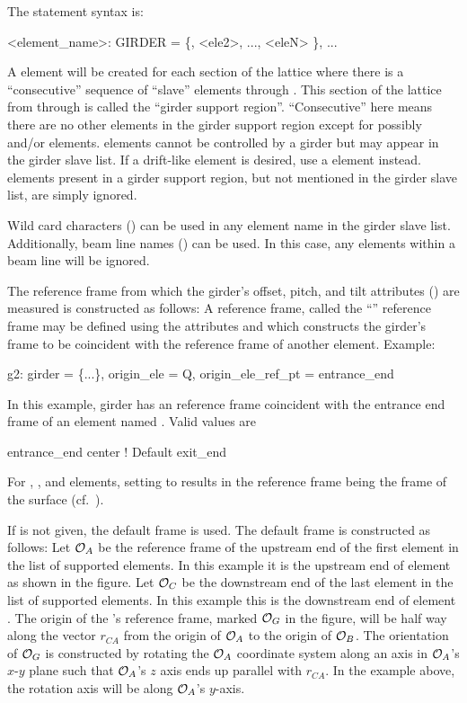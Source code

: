The  statement syntax is:
\begin{example}
  <element_name>: GIRDER = \{<ele1>, <ele2>, ..., <eleN> \}, ...
\end{example}
A  element will be created for each section of the lattice
where there is a ``consecutive'' sequence of ``slave'' elements
 through .  This section of the lattice from
 through  is called the ``girder support
region''.  ``Consecutive'' here means there are no other elements in the
girder support region except for possibly  and/or 
elements.   elements cannot be controlled by a girder but may
appear in the girder slave list. If a drift-like element is
desired, use a  element instead.  elements present
in a girder support region, but not mentioned in the girder slave
list, are simply ignored.

Wild card characters () can be used in any element
name in the girder slave list. Additionally, beam line names
() can be used. In this case, any  elements
within a beam line will be ignored.

The reference frame from which the girder's offset, pitch, and tilt
attributes () are measured is constructed as follows: A
reference frame, called the ``'' reference frame may be
defined using the attributes  and
 which constructs the girder's
 frame to be coincident with the reference frame of another
element. Example:
\begin{example}
  g2: girder = \{...\}, origin_ele = Q, origin_ele_ref_pt = entrance_end
\end{example}
In this example, girder  has an  reference frame
coincident with the entrance end frame of an element named
. Valid values are
\begin{example}
  entrance_end
  center        ! Default
  exit_end
\end{example}
For , , and  elements,
setting  to  results in the reference
frame being the frame of the surface (cf.~).

If  is not given, the default  frame is
used. The default  frame is constructed as follows:
Let ${\cal O}_A$ be the reference frame of the upstream end of
the first element in the list of supported elements. In this example
it is the upstream end of element  as shown in the figure. Let
${\cal O}_C$ be the downstream end of the last element in the list of
supported elements. In this example this is the downstream end of
element . The origin of the 's reference frame,
marked ${\cal O}_G$ in the figure, will be half way along the vector
$r_{CA}$ from the origin of ${\cal O}_A$ to the origin of ${\cal O}_B$.  The
orientation of ${\cal O}_G$ is constructed by rotating the ${\cal O}_A$
coordinate system along an axis in ${\cal O}_A$'s $x$-$y$ plane such that
${\cal O}_A$'s $z$ axis ends up parallel with $r_{CA}$. In the example
above, the rotation axis will be along ${\cal O}_A$'s $y$-axis.

